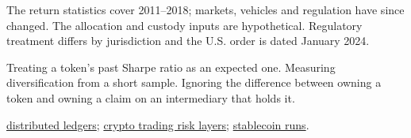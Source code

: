\begin{qfmethod}
 The return statistics cover 2011--2018; markets, vehicles and regulation have since changed. The allocation and custody inputs are hypothetical. Regulatory treatment differs by jurisdiction and the U.S. order is dated January 2024.

 Treating a token's past Sharpe ratio as an expected one. Measuring diversification from a short sample. Ignoring the difference between owning a token and owning a claim on an intermediary that holds it.

 \hyperref[def:distributed-ledger-applications]{distributed ledgers}; \hyperref[def:crypto-trading-risk-layers]{crypto trading risk layers}; \hyperref[ev:stablecoin-runs]{stablecoin runs}.

\end{qfmethod}

